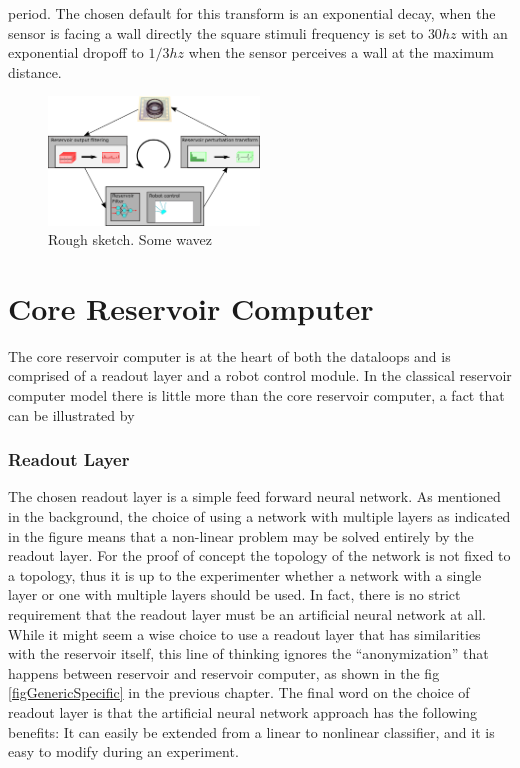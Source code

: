 period.
The chosen default for this transform is an exponential decay, when the sensor
is facing a wall directly the square stimuli frequency is set to $30hz$ with an
exponential dropoff to $1/3hz$ when the sensor perceives a wall at the maximum
distance.
\begin{figure}[h!]
  \centering
  \includegraphics[width=0.5\textwidth]{fig/RCloop.png}
  \caption{Rough sketch.
    Some wavez
  }
  \label{figDataLoop}
\end{figure}
%
\section{Core Reservoir Computer}
The core reservoir computer is at the heart of both the dataloops and is
comprised of a readout layer and a robot control module.
In the classical reservoir computer model there is little more than the core
reservoir computer, a fact that can be illustrated by 
\subsubsection{Readout Layer}
The chosen readout layer is a simple feed forward neural network.
As mentioned in the background, the choice of using a network with multiple
layers as indicated in the figure means that a non-linear problem may be solved
entirely by the readout layer.
For the proof of concept the topology of the network is not fixed to a topology,
thus it is up to the experimenter whether a network with a single layer or one
with multiple layers should be used.
In fact, there is no strict requirement that the readout layer must be an
artificial neural network at all.
While it might seem a wise choice to use a readout layer that has similarities
with the reservoir itself, this line of thinking ignores the ``anonymization''
that happens between reservoir and reservoir computer, as shown in the fig
\ref{figGenericSpecific} in the previous chapter.
The final word on the choice of readout layer is that the artificial neural
network approach has the following benefits:
It can easily be extended from a linear to nonlinear classifier, and it is easy
to modify during an experiment.

